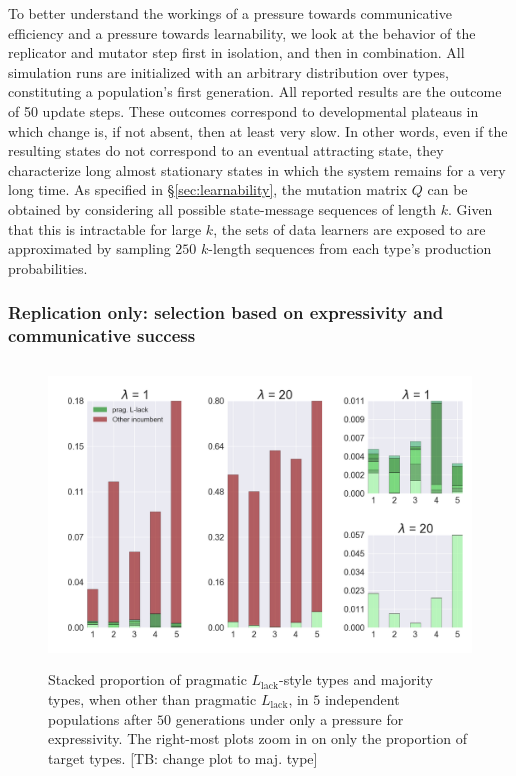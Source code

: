\documentclass[a4paper, 11pt]{article}
\theoremstyle{Satz}
\newcommand{\tb}[1]{\textcolor[rgb]{.8,.33,.0}{[TB: #1]}}%
\newcommand{\mylang}[1]{\ensuremath{L_{\text{#1}}}\xspace} %
\newcommand{\Llack}{\mylang{lack}}
\begin{document}
To better understand the workings of a pressure towards communicative efficiency and a pressure
towards learnability, we look at the behavior of the replicator and mutator step first in
isolation, and then in combination. All simulation runs are initialized with an arbitrary
distribution over types, constituting a population's first generation. All reported results are
the outcome of 50 update steps. These outcomes correspond to developmental plateaus in which
change is, if not absent, then at least very slow. In other words, even if the resulting states
do not correspond to an eventual attracting state, they characterize long almost stationary
states in which the system remains for a very long time. As specified in
\S\ref{sec:learnability}, the mutation matrix $Q$ can be obtained by considering all possible
state-message sequences of length $k$. Given that this is intractable for large $k$, the sets
of data learners are exposed to are approximated by sampling $250$ $k$-length sequences from
each type's production probabilities.


\subsubsection{Replication only: selection based on expressivity and communicative success} 


\begin{figure}[t]
\centering
\includegraphics[width=\textwidth,height=8cm, keepaspectratio]{./plots/fig1-onlyr}
\caption{Stacked proportion of pragmatic $\Llack$-style types and majority types, when other
  than pragmatic $\Llack$, in $5$ independent populations after $50$ generations under only a
  pressure for expressivity. The right-most plots zoom in on only the proportion of target types. \tb{change plot to maj. type}}
\label{fig:only-R}
\end{figure}
\end{document}
